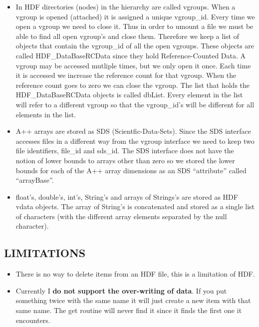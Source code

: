 \documentclass{article}
\begin{document}
\begin{itemize}
 \item   In HDF directories (nodes) in the hierarchy are called vgroups.
  When a vgroup is opened (attached) it is assigned a unique {\ff vgroup\_id}. 
  Every time we open a vgroup we need to close it. Thus in order to {\ff umount}
  a file we must be able to find all open vgroup's and close them. 
  Therefore we keep a list of objects that contain the {\ff vgroup\_id}
  of all the open vgroups. These objects are called {\ff HDF\_DataBaseRCData}
  since they hold Reference-Counted Data.
  A vgroup may be accessed mutliple times, but we only open it once. Each time
  it is accessed we increase the reference count for that vgroup.
 When the reference
 count goes to zero we can close the vgroup. The list that holds the 
 {\ff HDF\_DataBaseRCData} objects
  is called {\ff dbList}.
 Every element in the
 list will refer to a different vgroup so that the {\ff vgroup\_id}'s will
 be different for all elements in the list.

 \item A++ arrays are stored as SDS (Scientfic-Data-Sets). Since the SDS
   interface accesses files in a different way from the vgroup interface
  we need to keep two file identifiers, {\ff file\_id} and {\ff sds\_id}.
  The SDS interface does not have the notion of lower bounds to arrays
  other than zero so we stored the lower bounds for each of the A++
  array dimensions as an SDS ``attribute'' called ``arrayBase''.

 \item {\ff float}'s, {\ff double}'s, {\ff int}'s, {\ff String}'s 
  and arrays of {\ff Strings}'s are stored as HDF vdata objects. 
  The array of {\ff String's} is concatenated and stored as a
  single list of characters (with the different array elements separated
 by the null character).
\end{itemize}


\subsection{LIMITATIONS}

\begin{itemize}
 \item There is no way to delete items from an HDF file, this is a limitation of HDF.
 \item Currently I {\bf do not support the over-writing of data}. If you put something
     twice with the same name it will just create a new item with that same name. The get
     routine will never find it since it finds the first one it encounters. 
\end{itemize}
\end{document}
